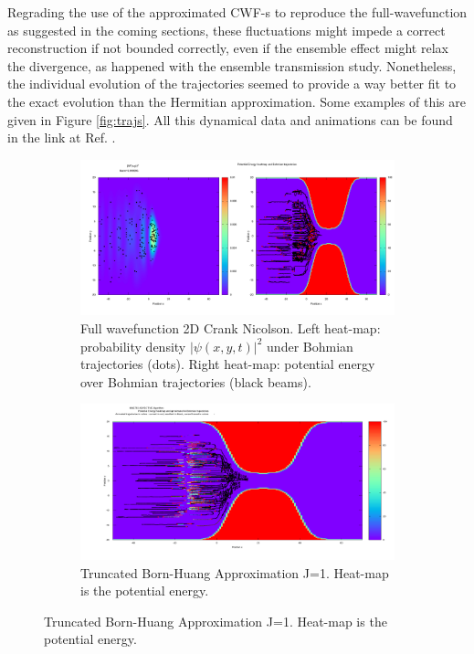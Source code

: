 \documentclass[11pt, a4paper]{article} %
\begin{document}
Regrading the use of the approximated CWF-s to reproduce the full-wavefunction as suggested in the coming sections, these fluctuations might impede a correct reconstruction if not bounded correctly, even if the ensemble effect might relax the divergence, as happened with the ensemble transmission study. Nonetheless, the individual evolution of the trajectories seemed to provide a way better fit to the exact evolution than the Hermitian approximation. Some examples of this are given in Figure \ref{fig:trajs}. All this dynamical data and animations can be found in the link at Ref. \cite{DATA}.\vspace{-0.2cm}


 \begin{figure}[h!]
  \centering
  \begin{subfigure}[b]{0.7\linewidth}
    \includegraphics[width=\linewidth]{k0_0.1_CN_GS.png}
    \caption{Full wavefunction 2D Crank Nicolson. Left heat-map: probability density $|\psi(x,y,t)|^2$ under Bohmian trajectories (dots). Right heat-map: potential energy over Bohmian trajectories (black beams).}
  \end{subfigure}
  \begin{subfigure}[b]{0.7\linewidth}
    \includegraphics[width=\linewidth]{k0_0.1_TBH_GS.png}
    \caption{Truncated Born-Huang Approximation J=1. Heat-map is the potential energy.}

\end{subfigure}
\end{figure}
\end{document}
